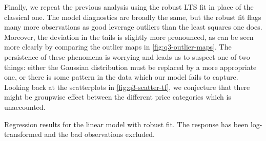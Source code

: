 \documentclass[titlepage]{article}
\begin{document}
Finally, we repeat the previous analysis using the robust LTS fit in place of the classical one. The model diagnostics are broadly the same, but the robust fit flags many more observations as good leverage outliers than the least squares one does. Moreover, the deviation in the tails is slightly more pronounced, as can be seen more clearly by comparing the outlier maps in \cref{fig:q3-outlier-maps}. The persistence of these phenomena is worrying and leads us to suspect one of two things: either the Gaussian distribution must be replaced by a more appropriate one, or there is some pattern in the data which our model fails to capture. Looking back at the scatterplots in \cref{fig:q3-scatter-tf}, we conjecture that there might be groupwise effect between the different price categories which is unaccounted.

\begin{table}[!htb]
  \centering
  
  \caption{Regression results for the linear model with robust fit. The response has been log-transformed and the bad observations excluded.}
  \label{tab:q3-reg-res-rob}
\end{table}
\end{document}
